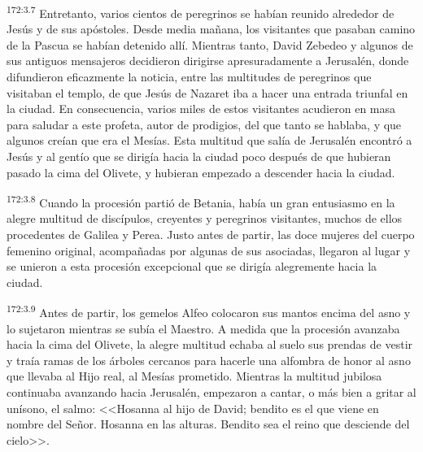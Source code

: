 \par 
\textsuperscript{172:3.7} Entretanto, varios cientos de peregrinos se habían reunido alrededor de Jesús y de sus apóstoles. Desde media mañana, los visitantes que pasaban camino de la Pascua se habían detenido allí. Mientras tanto, David Zebedeo y algunos de sus antiguos mensajeros decidieron dirigirse apresuradamente a Jerusalén, donde difundieron eficazmente la noticia, entre las multitudes de peregrinos que visitaban el templo, de que Jesús de Nazaret iba a hacer una entrada triunfal en la ciudad. En consecuencia, varios miles de estos visitantes acudieron en masa para saludar a este profeta, autor de prodigios, del que tanto se hablaba, y que algunos creían que era el Mesías. Esta multitud que salía de Jerusalén encontró a Jesús y al gentío que se dirigía hacia la ciudad poco después de que hubieran pasado la cima del Olivete, y hubieran empezado a descender hacia la ciudad.

\par 
\textsuperscript{172:3.8} Cuando la procesión partió de Betania, había un gran entusiasmo en la alegre multitud de discípulos, creyentes y peregrinos visitantes, muchos de ellos procedentes de Galilea y Perea. Justo antes de partir, las doce mujeres del cuerpo femenino original, acompañadas por algunas de sus asociadas, llegaron al lugar y se unieron a esta procesión excepcional que se dirigía alegremente hacia la ciudad.

\par 
\textsuperscript{172:3.9} Antes de partir, los gemelos Alfeo colocaron sus mantos encima del asno y lo sujetaron mientras se subía el Maestro. A medida que la procesión avanzaba hacia la cima del Olivete, la alegre multitud echaba al suelo sus prendas de vestir y traía ramas de los árboles cercanos para hacerle una alfombra de honor al asno que llevaba al Hijo real, al Mesías prometido. Mientras la multitud jubilosa continuaba avanzando hacia Jerusalén, empezaron a cantar, o más bien a gritar al unísono, el salmo: <<Hosanna al hijo de David; bendito es el que viene en nombre del Señor. Hosanna en las alturas. Bendito sea el reino que desciende del cielo>>.

